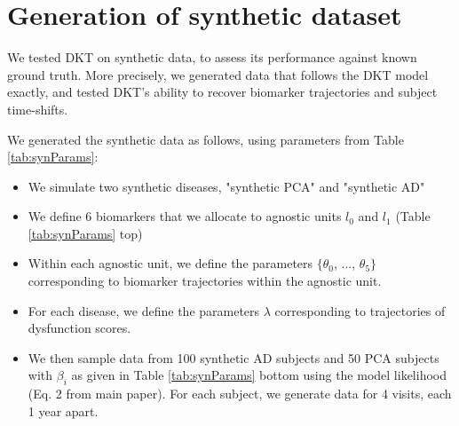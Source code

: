 \documentclass{llncs}
\begin{document}
\section{Generation of synthetic dataset}

We tested DKT on synthetic data, to assess its performance against known
ground truth. More precisely, we generated data that follows the DKT model
exactly, and tested DKT's ability to recover biomarker trajectories and subject time-shifts. 

We generated the synthetic data as follows, using parameters from Table \ref{tab:synParams}:
\begin{itemize}
 \item We simulate two synthetic diseases, "synthetic PCA" and "synthetic AD"
 \item We define 6 biomarkers that we allocate to agnostic units $l_0$ and $l_1$ (Table \ref{tab:synParams} top)
 \item Within each agnostic unit, we define the parameters $\{\theta_0$, ..., $\theta_5\}$ corresponding to biomarker trajectories within the agnostic unit.
 \item For each disease, we define the parameters $\lambda$ corresponding to trajectories of dysfunction scores.
 \item We then sample data from 100 synthetic AD subjects and 50 PCA subjects with $\beta_i$ as given in Table \ref{tab:synParams} bottom using the model likelihood (Eq. 2 from main paper). For each subject, we generate data for 4 visits, each 1 year apart.
\end{itemize}
\end{document}
